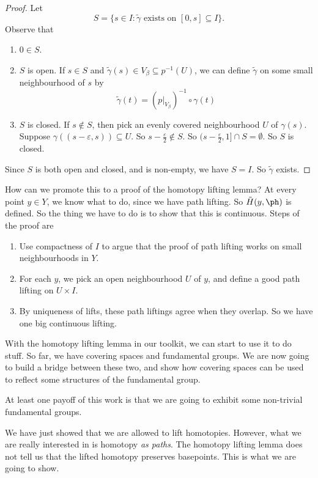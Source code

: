 \documentclass[a4paper]{article}
\begin{document}
\begin{proof}
  Let
  \[
    S = \{s \in I: \tilde{\gamma}\text{ exists on }[0, s] \subseteq I\}.
  \]
  Observe that
  \begin{enumerate}
    \item $0\in S$.
    \item $S$ is open. If $s\in S$ and $\tilde{\gamma}(s) \in V_\beta \subseteq p^{-1}(U)$, we can define $\tilde{\gamma}$ on some small neighbourhood of $s$ by
      \[
        \tilde{\gamma}(t) = (p|_{V_\beta})^{-1}\circ \gamma(t)
      \]

    \item $S$ is closed. If $s \not \in S$, then pick an evenly covered neighbourhood $U$ of $\gamma(s)$. Suppose $\gamma((s - \varepsilon, s)) \subseteq U$. So $s - \frac{\varepsilon}{2} \not \in S$. So $(s - \frac{\varepsilon}{2}, 1] \cap S = \emptyset$. So $S$ is closed.
  \end{enumerate}
  Since $S$ is both open and closed, and is non-empty, we have $S = I$. So $\tilde{\gamma}$ exists.
\end{proof}
How can we promote this to a proof of the homotopy lifting lemma? At every point $y\in Y$, we know what to do, since we have path lifting. So $\tilde{H}(y, \ph)$ is defined. So the thing we have to do is to show that this is continuous. Steps of the proof are
\begin{enumerate}
  \item Use compactness of $I$ to argue that the proof of path lifting works on small neighbourhoods in $Y$.
  \item For each $y$, we pick an open neighbourhood $U$ of $y$, and define a good path lifting on $U\times I$.
  \item By uniqueness of lifts, these path liftings agree when they overlap. So we have one big continuous lifting.
\end{enumerate}

With the homotopy lifting lemma in our toolkit, we can start to use it to do stuff. So far, we have covering spaces and fundamental groups. We are now going to build a bridge between these two, and show how covering spaces can be used to reflect some structures of the fundamental group.

At least one payoff of this work is that we are going to exhibit some non-trivial fundamental groups.

We have just showed that we are allowed to lift homotopies. However, what we are really interested in is homotopy \emph{as paths}. The homotopy lifting lemma does not tell us that the lifted homotopy preserves basepoints. This is what we are going to show.
\end{document}
